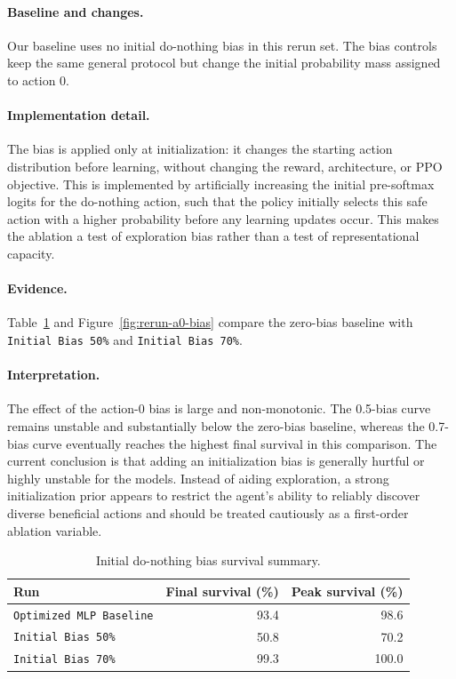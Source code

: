 \paragraph{Baseline and changes.}
Our baseline uses no initial do-nothing bias in this rerun set. The bias
controls keep the same general protocol but change the initial probability mass
assigned to action 0.


\paragraph{Implementation detail.}
The bias is applied only at initialization: it changes the starting action
distribution before learning, without changing the reward, architecture, or PPO
objective. This is implemented by artificially increasing the initial pre-softmax logits for the do-nothing action, such that the policy initially selects this safe action with a higher probability before any learning updates occur. This makes the ablation a test of exploration bias rather than a test
of representational capacity.

\paragraph{Evidence.}
Table~\ref{tab:a0-bias-summary} and Figure~\ref{fig:rerun-a0-bias} compare the
zero-bias baseline with \texttt{Initial Bias 50\%} and
\texttt{Initial Bias 70\%}.

\paragraph{Interpretation.}
The effect of the action-0 bias is large and non-monotonic. The 0.5-bias curve
remains unstable and substantially below the zero-bias baseline, whereas the
0.7-bias curve eventually reaches the highest final survival in this comparison.
The current conclusion is that adding an initialization bias is generally hurtful or highly unstable for the models. Instead of aiding exploration, a strong initialization prior appears to restrict the agent's ability to reliably discover diverse beneficial actions and should be treated cautiously as a first-order ablation variable.

\begin{table}[H]
  \centering
  \small
  \caption{Initial do-nothing bias survival summary.}
  \label{tab:a0-bias-summary}
  \begin{tabular}{lrr}
    \toprule
    Run & Final survival (\%) & Peak survival (\%) \\
    \midrule
    \texttt{Optimized MLP Baseline} & 93.4 & 98.6 \\
    \texttt{Initial Bias 50\%} & 50.8 & 70.2 \\
    \texttt{Initial Bias 70\%} & 99.3 & 100.0 \\
    \bottomrule
  \end{tabular}
\end{table}

